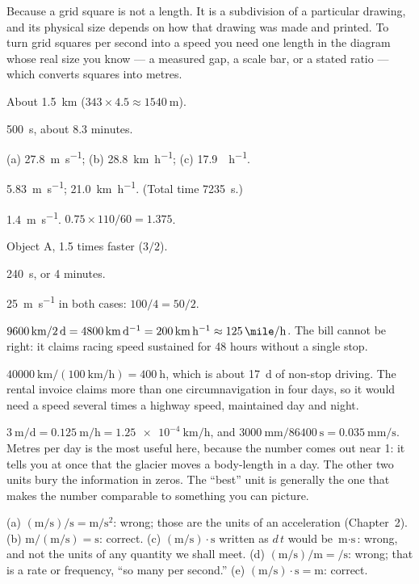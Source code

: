 \documentclass[11pt,twoside,openany]{book}
\begin{document}
\begin{description}[leftmargin=2.6em,itemsep=3pt,style=sameline]
  \item[1.15] Because a grid square is not a length. It is a subdivision of a particular drawing, and its physical size depends on how that drawing was made and printed. To turn grid squares per second into a speed you need one length in the diagram whose real size you know --- a measured gap, a scale bar, or a stated ratio --- which converts squares into metres.
  \item[1.16] About \SI{1.5}{\kilo\metre} ($343 \times 4.5 \approx \SI{1540}{\metre}$).
  \item[1.17] \SI{500}{\second}, about \num{8.3} minutes.
  \item[1.18] (a) \SI{27.8}{\metre\per\second}; (b) \SI{28.8}{\kilo\metre\per\hour}; (c) \SI{17.9}{\mile\per\hour}.
  \item[1.19] \SI{5.83}{\metre\per\second}; \SI{21.0}{\kilo\metre\per\hour}. (Total time \SI{7235}{\second}.)
  \item[1.20] \SI{1.4}{\metre\per\second}. $0.75 \times 110 / 60 = 1.375$.
  \item[1.21] Object A, \num{1.5} times faster ($3/2$).
  \item[1.22] \SI{240}{\second}, or \num{4} minutes.
  \item[1.23] \SI{25}{\metre\per\second} in both cases: $100/4 = 50/2$.
  \item[1.24] $\SI{9600}{\kilo\metre}/\SI{2}{\day} = \SI{4800}{\kilo\metre\per\day} = \SI{200}{\kilo\metre\per\hour} \approx \SI{125}{\mile\per\hour}$. The bill cannot be right: it claims racing speed sustained for \num{48} hours without a single stop.
  \item[1.25] $\SI{40000}{\kilo\metre}/(\SI{100}{\kilo\metre\per\hour}) = \SI{400}{\hour}$, which is about \SI{17}{\day} of non-stop driving. The rental invoice claims more than one circumnavigation in four days, so it would need a speed several times a highway speed, maintained day and night.
  \item[1.26] $\SI{3}{\metre\per\day} = \SI{0.125}{\metre\per\hour} = \SI{1.25e-4}{\kilo\metre\per\hour}$, and $\SI{3000}{\milli\metre}/\SI{86400}{\second} = \SI{0.035}{\milli\metre\per\second}$. Metres per day is the most useful here, because the number comes out near \num{1}: it tells you at once that the glacier moves a body-length in a day. The other two units bury the information in zeros. The ``best'' unit is generally the one that makes the number comparable to something you can picture.
  \item[1.27] (a) $(\si{\metre\per\second})/\si{\second} = \si{\metre\per\second\squared}$: wrong; those are the units of an acceleration (Chapter~2). (b) $\si{\metre}/(\si{\metre\per\second}) = \si{\second}$: correct. (c) $(\si{\metre\per\second})\cdot\si{\second}$ written as $d\,t$ would be $\si{\metre}\cdot\si{\second}$: wrong, and not the units of any quantity we shall meet. (d) $(\si{\metre\per\second})/\si{\metre} = \si{\per\second}$: wrong; that is a rate or frequency, ``so many per second.'' (e) $(\si{\metre\per\second})\cdot\si{\second} = \si{\metre}$: correct.

\end{description}
\end{document}
